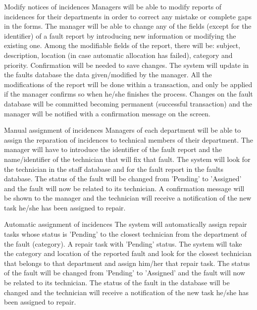 \begin{requirement}{Modify notices of incidences}
\reqdesc Managers will be able to modify reports of incidences for their departments in order to correct any mistake or complete gaps in the forms.
\reqin The manager will be able to change any of the fields (except for the identifier) of a fault report by introducing new information or modifying the existing one. Among the modifiable fields of the report, there will be: subject, description, location (in case automatic allocation has failed), category and priority. Confirmation will be needed to save changes.
\reqsteps The system will update in the faults database the data given/modified by the manager. All the modifications of the report will be done within a transaction, and only be applied if the manager confirms so when he/she finishes the process.
\reqout Changes on the fault database will be committed becoming permanent (successful transaction) and the manager will be notified with a confirmation message on the screen.
\end{requirement}

\begin{requirement}{Manual assignment of incidences}
\reqdesc Managers of each department will be able to assign the reparation of incidences to technical members of their department.
\reqin The manager will have to introduce the identifier of the fault report and the name/identifier of the technician that will fix that fault.
\reqsteps The system will look for the technician in the staff database and for the fault report in the faults database. The status of the fault will be changed from 'Pending' to 'Assigned' and the fault will now be related to its technician.
\reqout A confirmation message will be shown to the manager and the technician will receive a notification of the new task he/she has been assigned to repair.
\end{requirement}

\begin{requirement}{Automatic assignment of incidences}
\reqdesc The system will automatically assign repair tasks whose status is 'Pending' to the closest technician from the department of the fault (category).
\reqin A repair task with 'Pending' status.
\reqsteps The system will take the category and location of the reported fault and look for the closest technician that belongs to that department and assign him/her that repair task. The status of the fault will be changed from 'Pending' to 'Assigned' and the fault will now be related to its technician.
\reqout The status of the fault in the database will be changed and the technician will receive a notification of the new task he/she has been assigned to repair.
\end{requirement}

